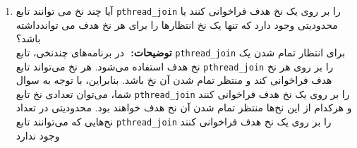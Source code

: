 \begin{qsolve}
\begin{enumerate}
	
	\item ‫آیا‬ ‫چند‬ ‫نخ‬ ‫می‬ ‫توانند ‬‫تابع‬ ‫‪\texttt{pthread\_join}‬‬ ‫را‬ ‫بر‬ ‫روی‬ ‫یک‬ ‫نخ‬ ‫هدف‬ ‫فراخوانی‬ ‫کنند‬ ‫یا‬ ‫محدودیتی‬ ‫وجود‬ ‫دارد‬ ‫که‬ ‫تنها‬ ‫یک ‬‫نخ‬ ‫انتظارها‬ ‫را‬ ‫برای‬ ‫هر‬ ‫نخ‬ ‫هدف‬ ‫می‬ ‫تواند‬‫داشته‬ ‫باشد؟ \\ \textbf{توضیحات: }‬
	در برنامه‌های چندنخی، تابع \texttt{pthread\_join} برای انتظار تمام شدن یک نخ هدف استفاده می‌شود. هر نخ می‌تواند تابع \texttt{pthread\_join} را بر روی هر نخ هدف فراخوانی کند و منتظر تمام شدن آن نخ باشد. بنابراین، با توجه به سوال شما، می‌توان تعدادی نخ تابع \texttt{pthread\_join} را بر روی یک نخ هدف فراخوانی کنند و هرکدام از این نخ‌ها منتظر تمام شدن آن نخ هدف خواهند بود. محدودیتی در تعداد نخ‌هایی که می‌توانند تابع \texttt{pthread\_join} را بر روی یک نخ هدف فراخوانی کنند وجود ندارد
	
	\end{enumerate}
	
	
\end{qsolve}



